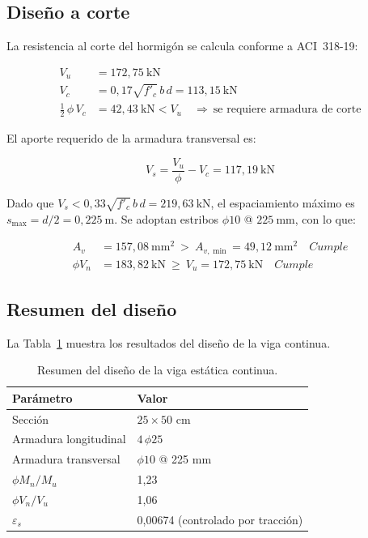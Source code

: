 \subsection{Diseño a corte}
 
La resistencia al corte del hormigón se calcula conforme a ACI~318-19:
 
\begin{align}
    V_u &= 172{,}75\ \text{kN} \\
    V_c &= 0{,}17\sqrt{f'_c}\,b\,d = 113{,}15\ \text{kN} \\
    \tfrac{1}{2}\,\phi\,V_c &= 42{,}43\ \text{kN} < V_u \quad \Rightarrow\ \text{se requiere armadura de corte}
\end{align}
 
El aporte requerido de la armadura transversal es:
 
\begin{equation}
    V_s = \frac{V_u}{\phi} - V_c = 117{,}19\ \text{kN}
\end{equation}
 
Dado que $V_s < 0{,}33\sqrt{f'_c}\,b\,d = 219{,}63\ \text{kN}$, el espaciamiento máximo es $s_{\max} = d/2 = 0{,}225\ \text{m}$. Se adoptan estribos $\phi 10$ @ $225\ \text{mm}$, con lo que:
 
\begin{align}
    A_{v} &= 157{,}08\ \text{mm}^2\ >\ A_{v,\min} = 49{,}12\ \text{mm}^2 \quad Cumple \\
    \phi V_n &= 183{,}82\ \text{kN}\ \geq\ V_u = 172{,}75\ \text{kN} \quad Cumple
\end{align}
 
\subsection{Resumen del diseño}
 
La Tabla~\ref{tab:viga-resumen} muestra los resultados del diseño de la viga continua.
 
\begin{table}[h!]
\centering
\caption{Resumen del diseño de la viga estática continua.}
\label{tab:viga-resumen}
\begin{tabular}{ll}
\toprule
Parámetro & Valor \\
\midrule
Sección & $25 \times 50$ cm \\
Armadura longitudinal & $4\,\phi 25$ \\
Armadura transversal & $\phi 10$ @ 225 mm \\
$\phi M_n / M_u$ & 1{,}23 \\
$\phi V_n / V_u$ & 1{,}06 \\
$\varepsilon_s$ & 0{,}00674 (controlado por tracción) \\
\bottomrule
\end{tabular}
\end{table}

